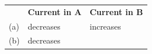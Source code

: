 \begin{enumerate}[noitemsep, label=\textbf{\arabic*}. ]
\begin{enumerate}[noitemsep, label=\textbf{\alph*}. ]
{{\begin{center}
\begin{xtabular}[t]{|l|l|l|}
    
         &
    
    
        \textbf{Current in A} &
    
    
        \textbf{Current in B}%
     \tabularnewline{}
    
    
        (a) &
    
    
        decreases &
    
    
        increases%
     \tabularnewline{}
    
    
        (b) &
    
    
        decreases &
    
    

\end{xtabular}
\end{center}}}
\end{enumerate}
\end{enumerate}
